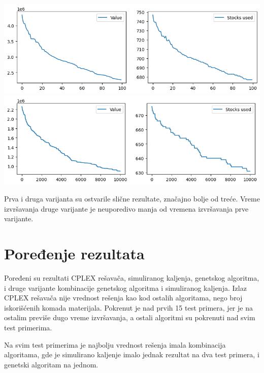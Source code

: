 \documentclass[12pt, a4paper]{article}
\begin{document}
\vspace{0.5cm}
\begin{center}
  \hspace{1cm}
  \includegraphics[width=\linewidth]{img/ga_sa_3.png}
  \includegraphics[width=\linewidth]{img/ga_sa_3_part2.png}
  \hspace{1cm} 
\end{center}
\vspace{0.5cm}

Prva i druga varijanta su ostvarile slične rezultate, značajno bolje od treće. Vreme izvršavanja druge varijante je neuporedivo manja od vremena izvršavanja prve varijante.


\section{Poređenje rezultata}

Poređeni su rezultati CPLEX rešavača, simuliranog kaljenja, genetskog algoritma, i druge varijante kombinacije genetskog algoritma i simuliranog kaljenja. Izlaz CPLEX rešavača nije vrednost rešenja kao kod ostalih algoritama, nego broj iskorišćenih komada materijala. Pokrenut je nad prvih 15 test primera, jer je na ostalim previše dugo vreme izvršavanja, a ostali algoritmi su pokrenuti nad svim test primerima.

Na svim test primerima je najbolju vrednost rešenja imala kombinacija algoritama, gde je simulirano kaljenje imalo jednak rezultat na dva test primera, i genetski algoritam na jednom.
\end{document}
